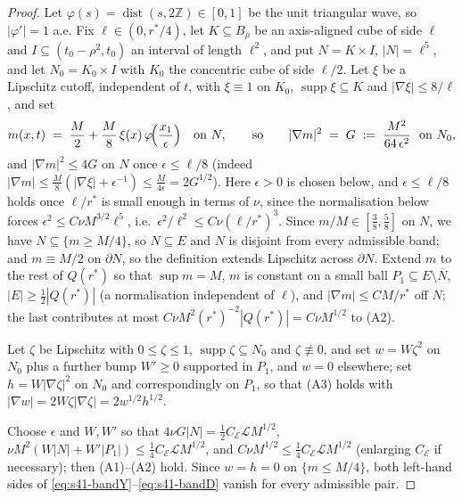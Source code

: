 \documentclass[11pt]{article}
\theoremstyle{definition}
\theoremstyle{remark}
\begin{document}
\begin{proof}
  Let $\varphi(s)=\operatorname{dist}(s,2\mathbb{Z})\in[0,1]$ be the unit
  triangular wave, so $|\varphi'|=1$ a.e. Fix $\ell\in(0,r^*/4)$, let
  $K\subseteq B_\rho$ be an axis-aligned cube of side $\ell$ and $I\subseteq
  (t_0-\rho^2,t_0)$ an interval of length $\ell^2$, and put $N=K\times I$,
  $|N|=\ell^5$, and let $N_0=K_0\times I$ with $K_0$ the concentric cube of
  side $\ell/2$. Let $\xi$ be a Lipschitz cutoff, independent of $t$, with
  $\xi\equiv1$ on $K_0$, $\operatorname{supp}\xi\subseteq K$ and
  $|\nabla\xi|\leq8/\ell$, and set
  \[
    m(x,t)\;=\;\frac{M}{2}+\frac{M}{8}\,\xi(x)\,
      \varphi\!\Bigl(\frac{x_1}{\epsilon}\Bigr)
    \quad\text{on }N,
    \qquad\text{so}\qquad
    |\nabla m|^2 \;=\; G \;:=\;\frac{M^2}{64\,\epsilon^2}
    \ \text{ on }N_0,
  \]
  and $|\nabla m|^2\leq 4G$ on $N$ once $\epsilon\leq\ell/8$ (indeed
  $|\nabla m|\leq\tfrac{M}{8}(|\nabla\xi|+\epsilon^{-1})
  \leq\tfrac{M}{4\epsilon}=2G^{1/2}$). Here $\epsilon>0$ is chosen below, and
  $\epsilon\leq\ell/8$ holds once $\ell/r^*$ is small enough in terms of $\nu$,
  since the normalisation below forces
  $\epsilon^2\leq C\nu M^{3/2}\ell^{5}$, i.e.\
  $\epsilon^2/\ell^2\leq C\nu(\ell/r^*)^{3}$.
  Since $m/M\in[\tfrac38,\tfrac58]$ on $N$, we have
  $N\subseteq\{m\geq M/4\}$, so $N\subseteq E$ and $N$ is disjoint from every
  admissible band; and $m\equiv M/2$ on $\partial N$, so the definition
  extends Lipschitz across $\partial N$. Extend $m$ to the rest of $Q(r^*)$
  so that $\sup m=M$, $m$ is constant on a small ball $P_1\subseteq
  E\setminus\overline{N}$, $|E|\geq\tfrac12|Q(r^*)|$ (a normalisation
  independent of $\ell$), and $|\nabla m|\leq CM/r^*$ off $N$; the last
  contributes at most $C\nu M^2(r^*)^{-2}|Q(r^*)| = C\nu M^{1/2}$ to (A2).

  Let $\zeta$ be Lipschitz with $0\leq\zeta\leq1$,
  $\operatorname{supp}\zeta\subseteq N_0$ and $\zeta\not\equiv0$, and set
  $w=W\zeta^2$ on $N_0$ plus a further bump $W'\ge0$ supported in $P_1$, and
  $w=0$ elsewhere; set $h=W|\nabla\zeta|^2$ on $N_0$ and correspondingly on
  $P_1$, so that (A3) holds with
  $|\nabla w|=2W\zeta|\nabla\zeta|=2w^{1/2}h^{1/2}$.

  Choose $\epsilon$ and $W,W'$ so that
  $4\nu G|N| = \tfrac12 C_{\mathcal{E}}\mathcal{L}M^{1/2}$,
  $\nu M^2(W|N|+W'|P_1|)\leq\tfrac14C_{\mathcal{E}}\mathcal{L}M^{1/2}$, and
  $C\nu M^{1/2}\leq\tfrac14C_{\mathcal{E}}\mathcal{L}M^{1/2}$ (enlarging
  $C_{\mathcal{E}}$ if necessary); then (A1)--(A2) hold. Since $w=h=0$ on
  $\{m\leq M/4\}$, both left-hand sides of
  \eqref{eq:s41-bandY}--\eqref{eq:s41-bandD} vanish for every admissible pair.


\end{proof}
\end{document}
